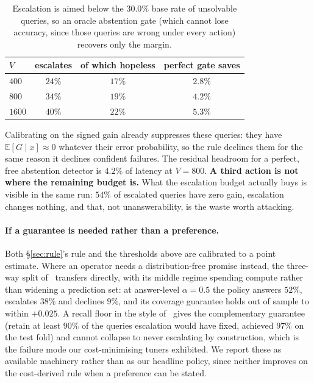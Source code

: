 \documentclass[10pt,twocolumn]{article}
\theoremstyle{plain}
\begin{document}
\begin{table}[h]
\centering\small
\begin{tabular}{lccc}
\toprule
$V$ & escalates & of which hopeless & perfect gate saves \\
\midrule
$400$  & $24\%$ & $17\%$ & $2.8\%$ \\
$800$  & $34\%$ & $19\%$ & $4.2\%$ \\
$1600$ & $40\%$ & $22\%$ & $5.3\%$ \\
\bottomrule
\end{tabular}
\caption{Escalation is aimed below the $30.0\%$ base rate of unsolvable
queries, so an oracle abstention gate (which cannot lose accuracy, since those queries are wrong under every action) recovers only the margin.}
\label{tab:abstain}
\end{table}

Calibrating on the signed gain already suppresses these queries: they have
$\mathbb{E}[G \mid x] \approx 0$ whatever their error probability, so the rule
declines them for the same reason it declines confident failures. The residual
headroom for a perfect, free abstention detector is $4.2\%$ of latency at
$V=800$. \textbf{A third action is not where the remaining budget is.} What the
escalation budget actually buys is visible in the same run: $54\%$ of escalated
queries have zero gain, escalation changes nothing, and that, not
unanswerability, is the waste worth attacking.

\paragraph{If a guarantee is needed rather than a preference.} Both
\S\ref{sec:rule}'s rule and the thresholds above are calibrated to a point
estimate. Where an operator needs a distribution-free promise instead, the
three-way split of~\cite{conformal} transfers directly, with its middle regime
spending compute rather than widening a prediction set: at answer-level
$\alpha = 0.5$ the policy answers $52\%$, escalates $38\%$ and declines $9\%$,
and its coverage guarantee holds out of sample to within $+0.025$. A recall
floor in the style of~\cite{recall} gives the complementary guarantee (retain at least $90\%$ of the queries escalation would have fixed, achieved $97\%$ on the test fold) and cannot collapse to never escalating by construction, which
is the failure mode our cost-minimising tuners exhibited. We report these as
available machinery rather than as our headline policy, since neither improves
on the cost-derived rule when a preference can be stated.
\end{document}
